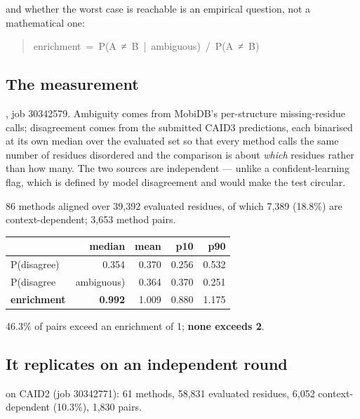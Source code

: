 and whether the worst case is reachable is an empirical question, not a
mathematical one:

\begin{quote}\ttfamily\footnotesize\begin{flushleft}
enrichment~=~P(A~≠~B~|~ambiguous)~/~P(A~≠~B)\\
\end{flushleft}\end{quote}


\subsection*{The measurement}

, job 30342579. Ambiguity comes from MobiDB's
per-structure missing-residue calls; disagreement comes from the submitted CAID3
predictions, each binarised at its own median over the evaluated set so that
every method calls the same number of residues disordered and the comparison is
about \emph{which} residues rather than how many. The two sources are independent ---
unlike a confident-learning flag, which is defined by model disagreement and
would make the test circular.

86 methods aligned over 39,392 evaluated residues, of which 7,389 (18.8\%) are
context-dependent; 3,653 method pairs.

\begin{center}\footnotesize
\begin{tabular}{lrrrr}
\toprule
\textbf{} & \textbf{median} & \textbf{mean} & \textbf{p10} & \textbf{p90} \\
\midrule
P(disagree) & 0.354 & 0.370 & 0.256 & 0.532 \\
P(disagree \ & ambiguous) & 0.364 & 0.370 & 0.251 \\
\textbf{enrichment} & \textbf{0.992} & 1.009 & 0.880 & 1.175 \\
\bottomrule
\end{tabular}
\end{center}

46.3\% of pairs exceed an enrichment of 1; \textbf{none exceeds 2}.


\subsection*{It replicates on an independent round}

 on CAID2 (job 30342771): 61 methods, 58,831 evaluated
residues, 6,052 context-dependent (10.3\%), 1,830 pairs.

